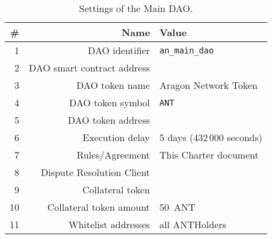 
\label{chap:DAOParameters}


\begin{table}[h!]
	\caption{Settings of the Main DAO.}
	\centering
	\begin{tabular}{rrl}
		\toprule
		\# & Name & Value \\
		\midrule
		1 & \ac{DAO} identifier & \texttt{an\_main\_dao}\\
		2 & \ac{DAO} smart contract address & \mainDaoAddr\\
		3 & \ac{DAO} token name & Aragon Network Token\\
		4 & \ac{DAO} token symbol & \texttt{\ac{ANT}}\\
		5 & \ac{DAO} token address & \mainDaoTokenAddr\\
		6 & Execution delay & 5 days (432\,000 seconds)\\
		7 & Rules/Agreement & This Charter document\\
		8 & Dispute Resolution Client & \aragonCourtAddr\\
		9 & Collateral token & \antTokenAddr\\
		10 & Collateral token amount & 50~\ac{ANT}\\
		11 & Whitelist addresses & all \glspl{ANTHolder}\\
		\bottomrule
	\end{tabular}
\end{table}



